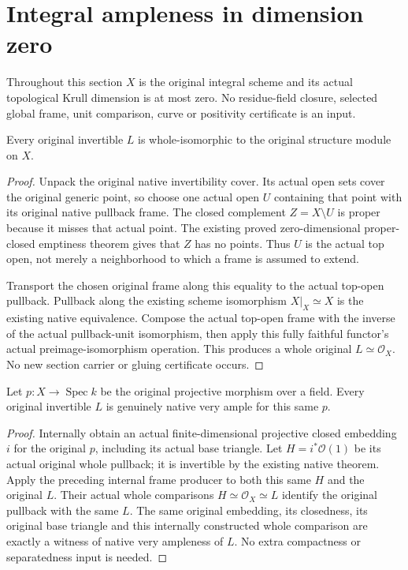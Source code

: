 \section{Integral ampleness in dimension zero}
Throughout this section $X$ is the original integral scheme and its actual
topological Krull dimension is at most zero. No residue-field closure,
selected global frame, unit comparison, curve or positivity certificate
is an input.

\begin{lemma}
\label{lem:seshadri-original-dimzero-global-frame}
\leanok
Every original invertible $L$ is whole-isomorphic to the original
structure module on $X$.
\end{lemma}
\begin{proof}
Unpack the original native invertibility cover. Its actual open sets
cover the original generic point, so choose one actual open $U$ containing
that point with its original native pullback frame. The closed complement
$Z=X\setminus U$ is proper because it misses that actual point. The
existing proved zero-dimensional proper-closed emptiness theorem gives
that $Z$ has no points. Thus $U$ is the actual top open, not merely a
neighborhood to which a frame is assumed to extend.

Transport the chosen original frame along this equality to the actual
top-open pullback. Pullback along the existing scheme isomorphism
$X|_X\simeq X$ is the existing native equivalence. Compose the actual
top-open frame with the inverse of the actual pullback-unit isomorphism,
then apply this fully faithful functor's actual preimage-isomorphism
operation. This produces a whole original $L\simeq\mathcal O_X$.
No new section carrier or gluing certificate occurs.
\end{proof}

\begin{theorem}
\label{thm:seshadri-original-dimzero-very-ample}
\leanok
Let $p:X\to\operatorname{Spec}k$ be the original projective morphism
over a field. Every original invertible $L$ is genuinely native very
ample for this same $p$.
\end{theorem}
\begin{proof}
Internally obtain an actual finite-dimensional projective closed
embedding $i$ for the original $p$, including its actual base triangle.
Let $H=i^*\mathcal O(1)$ be its actual original whole pullback; it is
invertible by the existing native theorem. Apply the preceding internal
frame producer to both this same $H$ and the original $L$. Their actual
whole comparisons $H\simeq\mathcal O_X\simeq L$ identify the original
pullback with the same $L$. The same original embedding, its closedness,
its original base triangle and this internally constructed whole
comparison are exactly a witness of native very ampleness of $L$.
No extra compactness or separatedness input is needed.
\end{proof}

